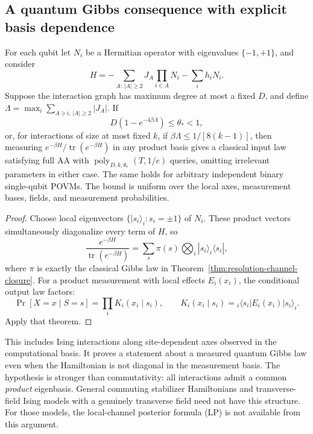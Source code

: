 \subsection{A quantum Gibbs consequence with explicit basis dependence}
\label{sec:resolution-commuting-measurements}

\begin{corollary}
\label{cor:resolution-commuting-measurements}
For each qubit let \(N_i\) be a Hermitian operator with eigenvalues
\(\{-1,+1\}\), and consider
\[
 H=-\sum_{A:\,|A|\ge2}J_A\prod_{i\in A}N_i-\sum_i h_iN_i.
\]
Suppose the interaction graph has maximum degree at most a fixed
\(D\), and define
\(\Lambda=\max_i\sum_{A\ni i,\,|A|\ge2}|J_A|\).
If
\[
 D(1-e^{-4\beta\Lambda})\le\theta_*<1,
\]
or, for interactions of size at most fixed \(k\), if
\(\beta\Lambda\le1/[8(k-1)]\),
then measuring \(e^{-\beta H}/\operatorname{tr}(e^{-\beta H})\)
in any product basis gives a classical input law satisfying full AA
with \(\operatorname{poly}_{D,k,\theta_*}(T,1/e)\) queries,
omitting irrelevant parameters in either case.
The same holds for arbitrary independent binary single-qubit POVMs.
The bound is uniform over the local axes, measurement bases, fields,
and measurement probabilities.
\end{corollary}

\begin{proof}
Choose local eigenvectors \(\{|s_i\rangle_i:s_i=\pm1\}\) of
\(N_i\). These product vectors simultaneously diagonalize every
term of \(H\), so
\[
 \frac{e^{-\beta H}}{\operatorname{tr}(e^{-\beta H})}
 =\sum_s\pi(s)\bigotimes_i |s_i\rangle_i\langle s_i|,
\]
where \(\pi\) is exactly the classical Gibbs law in
Theorem~\ref{thm:resolution-channel-closure}. For a product measurement
with local effects \(E_i(x_i)\), the conditional output law factors:
\[
 \Pr[X=x\mid S=s]
 =\prod_i K_i(x_i\mid s_i),\qquad
 K_i(x_i\mid s_i)={}_i\langle s_i|E_i(x_i)|s_i\rangle_i.
\]
Apply that theorem.
\end{proof}

This includes Ising interactions along site-dependent axes observed
in the computational basis. It proves a statement about a measured
quantum Gibbs law even when the Hamiltonian is not diagonal in the
measurement basis. The hypothesis is stronger than commutativity:
all interactions admit a common \emph{product} eigenbasis. General
commuting stabilizer Hamiltonians and transverse-field Ising models
with a genuinely transverse field need not have this structure.
For those models, the local-channel posterior formula (LP) is not
available from this argument.
